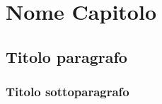 \chapter{Nome Capitolo}

\lipsum[1][1-3]

\section{Titolo paragrafo}

\lipsum[1]

\subsection{Titolo sottoparagrafo}

\lipsum